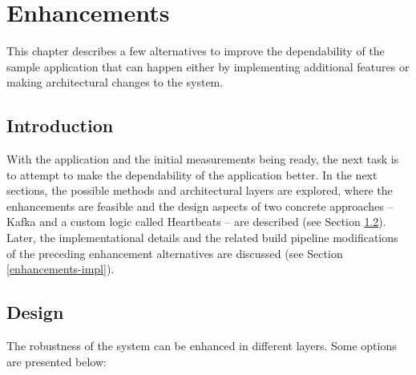 \chapter{Enhancements} \label{enhancements}

This chapter describes a few alternatives to improve the dependability of the sample application that can happen either by implementing additional features or making architectural changes to the system.

\section{Introduction}

With the application and the initial measurements being ready, the next task is to attempt to make the dependability of the application better. In the next sections, the possible methods and architectural layers are explored, where the enhancements are feasible and the design aspects of two concrete approaches -- Kafka and a custom logic called Heartbeats -- are described (see Section \ref{enhancements-design}). Later, the implementational details and the related build pipeline modifications of the preceding enhancement alternatives are discussed (see Section \ref{enhancements-impl}).

\section{Design} \label{enhancements-design}


The robustness of the system can be enhanced in different layers. Some options are presented below:

